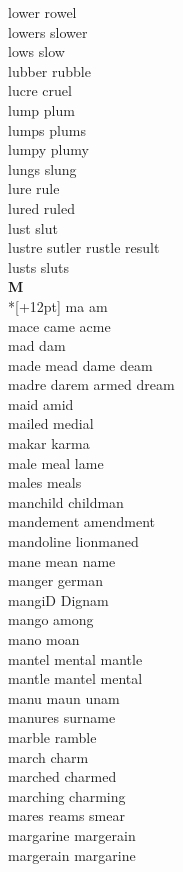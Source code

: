 lower rowel\\
lowers slower\\
lows slow\\
lubber rubble\\
lucre cruel\\
lump plum\\
lumps plums\\
lumpy plumy\\
lungs slung\\
lure rule\\
lured ruled\\
lust slut\\
lustre sutler rustle result\\
lusts sluts\\

\vspace{14pt}
\noindent\textbf{\Large M}\\*[+12pt]
ma am\\
mace came acme\\
mad dam\\
made mead dame deam\\
madre darem armed dream\\
maid amid\\
mailed medial\\
makar karma\\
male meal lame\\
males meals\\
manchild childman\\
mandement amendment\\
mandoline lionmaned\\
mane mean name\\
manger german\\
mangiD Dignam\\
mango among\\
mano moan\\
mantel mental mantle\\
mantle mantel mental\\
manu maun unam\\
manures surname\\
marble ramble\\
march charm\\
marched charmed\\
marching charming\\
mares reams smear\\
margarine margerain\\
margerain margarine\\
